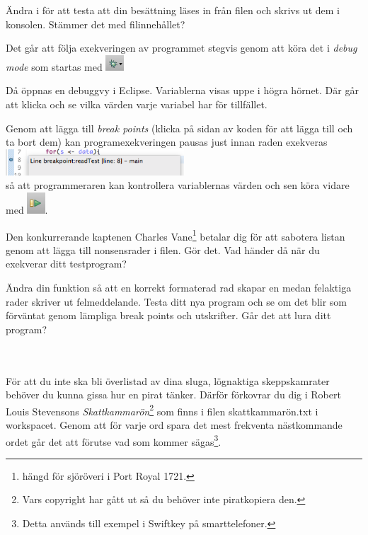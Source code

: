 \Subtask Ändra i  för att testa att din besättning läses in från filen och skrivs ut dem i konsolen. Stämmer det med filinnehållet?

\Subtask Det går att följa exekveringen av programmet stegvis genom att köra det i \emph{debug mode} som startas med 
\includegraphics[width=0.05\textwidth]{../img/pirates/bug.png}

Då öppnas en debuggvy i Eclipse. Variablerna visas uppe i högra hörnet. Där går att klicka och se vilka värden varje variabel har för tillfället. 

Genom att lägga till \emph{break points} (klicka på sidan av koden för att lägga till och ta bort dem) kan programexekveringen pausas just innan raden exekveras  \\
\includegraphics[width=0.5\textwidth]{../img/pirates/breakpoint.png} \\
så att programmeraren kan kontrollera variablernas värden och sen köra vidare med \includegraphics[width=0.05\textwidth]{../img/pirates/next.png}.

\Subtask Den konkurrerande kaptenen Charles Vane\footnote{hängd för sjöröveri i Port Royal 1721.} betalar dig för att sabotera listan genom att lägga till nonsensrader i filen. Gör det. Vad händer då när du exekverar ditt testprogram?

\Subtask Ändra din funktion  så att en korrekt formaterad rad skapar en  medan felaktiga rader skriver ut felmeddelande.
Testa ditt nya program och se om det blir som förväntat genom lämpliga break points och utskrifter. Går det att lura ditt program?

\\
\noindent \\
För att du inte ska bli överlistad av dina sluga, lögnaktiga skeppskamrater behöver du kunna gissa hur en pirat tänker. Därför förkovrar du dig i Robert Louis Stevensons \emph{Skattkammarön}\footnote{Vars copyright har gått ut så du behöver inte piratkopiera den.} som finns i filen skattkammarön.txt i workspacet.  Genom att för varje ord spara det mest frekventa nästkommande ordet går det att förutse vad som kommer sägas\footnote{Detta används till exempel i Swiftkey på smarttelefoner.}. 

